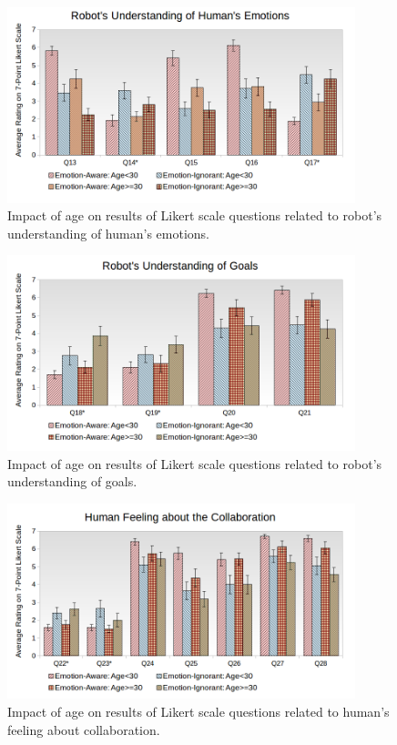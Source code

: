 \documentclass[12pt]{report}
\begin{document}
\begin{figure}[!h]
\centering
\includegraphics[width=0.9\textwidth]{figure/Age-Emotions.png}
\caption{Impact of age on results of Likert scale questions related to robot's
understanding of human's emotions.}
\label{fig:age-emotions}
\vspace*{15mm}
\end{figure}

\begin{figure}[!h]
\centering
\includegraphics[width=0.9\textwidth]{figure/Age-Goals.png}
\caption{Impact of age on results of Likert scale questions related to robot's
understanding of goals.}
\label{fig:age-goals}
\vspace*{10mm}
\end{figure}

\begin{figure}[!h]
\centering
\includegraphics[width=0.9\textwidth]{figure/Age-Collaboration.png}
\caption{Impact of age on results of Likert scale questions related to human's
feeling about collaboration.}
\label{fig:age-collaboration}
\vspace*{15mm}
\end{figure}
\end{document}
